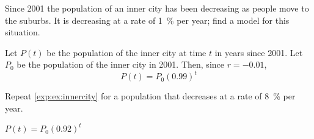 \begin{pccexample}\label{exp:ex:innercity}
	Since 2001 the population of an inner city has been decreasing as people 
	move to the suburbs. It is decreasing at a rate of \SI{1}{\percent} per year; find a model 
	for this situation.
	\begin{pccsolution}
		Let $P(t)$ be the population of the inner city at time $t$ in years since 2001. 
		Let $P_0$ be the population of the inner city in 2001.
		Then, since $r=-0.01$,
		\[
			P(t) = P_0(0.99)^t
		\]
	\end{pccsolution}
\end{pccexample}
			
\begin{doyouunderstand}
	\begin{problem}
	Repeat \cref{exp:ex:innercity} for a population that decreases at a rate of \SI{8}{\percent} per year.
	\begin{shortsolution}
		$P(t)=P_0(0.92)^t$ 
	\end{shortsolution}
	\end{problem}
\end{doyouunderstand}
			
